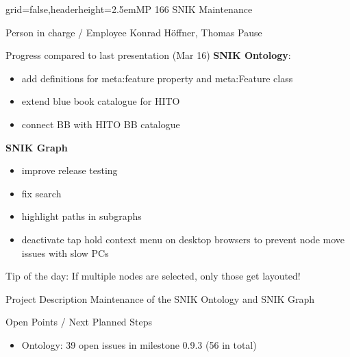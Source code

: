 \documentclass[english]{kiesgrube}
\begin{document}

\newpage

\begin{poster}{grid=false,headerheight=2.5em}{}{MP 166 SNIK Maintenance}{}{}
\begin{posterbox}[name=person,column=0,row=0]{Person in charge / Employee}
Konrad Höffner, Thomas Pause
\end{posterbox}
\begin{posterbox}[name=progress,below=person]{Progress compared to last presentation (Mar 16)}
\textbf{SNIK Ontology}:
\begin{itemize}
\item add definitions for meta:feature property and meta:Feature class
\item extend blue book catalogue for HITO
\item connect BB with HITO BB catalogue
\end{itemize}
\textbf{SNIK Graph}
\begin{itemize}
\item improve release testing 
\item fix search
\item highlight paths in subgraphs
\item deactivate tap hold context menu on desktop browsers to prevent node move issues with slow PCs
\end{itemize}
Tip of the day: If multiple nodes are selected, only those get layouted!
\end{posterbox}
\begin{posterbox}[name=description,column=1,row=0]{Project Description}
Maintenance of the SNIK Ontology and SNIK Graph
\end{posterbox}
\begin{posterbox}[name=open,column=1,below=description]{Open Points / Next Planned Steps}
\begin{itemize}
\item Ontology: 39 open issues in milestone 0.9.3 (56 in total)

\end{itemize}
\end{posterbox}
\end{poster}
\end{document}
